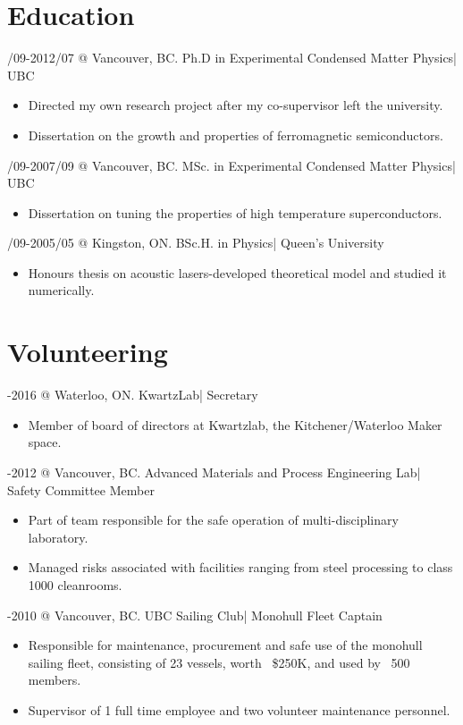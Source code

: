 \documentclass[10pt,letterpaper]{resume}
\begin{document}
\section{Education}

/09-2012/07 @ Vancouver, BC. Ph.D in Experimental Condensed Matter Physics| UBC
\begin{itemize}
\item Directed my own research project after my co-supervisor left the university.
\item Dissertation on the growth and properties of ferromagnetic semiconductors.
\end{itemize}

/09-2007/09 @ Vancouver, BC. MSc. in Experimental Condensed Matter Physics| UBC
\begin{itemize}
\item Dissertation on tuning the properties of high temperature superconductors.
\end{itemize}

/09-2005/05 @ Kingston, ON. BSc.H. in Physics| Queen's University
\begin{itemize}
\item Honours thesis on acoustic lasers-developed theoretical model and studied it numerically.
\end{itemize}

\section{Volunteering}

-2016 @ Waterloo, ON. KwartzLab| Secretary
\begin {itemize}
\item Member of board of directors at Kwartzlab, the Kitchener/Waterloo Maker space.
\end {itemize}

-2012 @ Vancouver, BC. Advanced Materials and Process Engineering Lab| Safety Committee Member
\begin{itemize}
\item Part of team responsible for the safe operation of multi-disciplinary laboratory.
\item Managed risks associated with facilities ranging from steel processing to class 1000 cleanrooms.
\end{itemize}

-2010 @ Vancouver, BC. UBC Sailing Club| Monohull Fleet Captain
\begin{itemize}
\item Responsible for maintenance, procurement and safe use of the monohull sailing fleet, consisting of 23 vessels, worth ~\$250K, and used by ~500 members.
\item Supervisor of 1 full time employee and two volunteer maintenance personnel.
\end{itemize}
\end{document}
